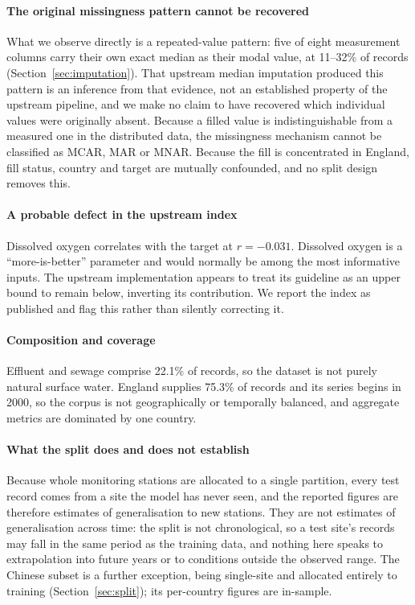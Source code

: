 \paragraph{The original missingness pattern cannot be recovered}
What we observe directly is a repeated-value pattern: five of eight measurement columns
carry their own exact median as their modal value, at 11--32\% of records
(Section~\ref{sec:imputation}). That upstream median imputation produced this pattern is
an inference from that evidence, not an established property of the upstream pipeline, and
we make no claim to have recovered which individual values were originally absent. Because
a filled value is indistinguishable from a measured one in the distributed data, the
missingness mechanism cannot be classified as MCAR, MAR or MNAR. Because the fill is concentrated in
England, fill status, country and target are mutually confounded, and no split design
removes this.

\paragraph{A probable defect in the upstream index}
Dissolved oxygen correlates with the target at $r = -0.031$. Dissolved oxygen is a
``more-is-better'' parameter and would normally be among the most informative inputs. The
upstream implementation appears to treat its guideline as an upper bound to remain below,
inverting its contribution. We report the index as published and flag this rather than
silently correcting it.

\paragraph{Composition and coverage}
Effluent and sewage comprise 22.1\% of records, so the dataset is not purely natural
surface water. England supplies 75.3\% of records and its series begins in 2000, so the
corpus is not geographically or temporally balanced, and aggregate metrics are dominated
by one country.

\paragraph{What the split does and does not establish}
Because whole monitoring stations are allocated to a single partition, every test record
comes from a site the model has never seen, and the reported figures are therefore
estimates of generalisation to new stations. They are not estimates of generalisation
across time: the split is not chronological, so a test site's records may fall in the
same period as the training data, and nothing here speaks to extrapolation into future
years or to conditions outside the observed range. The Chinese subset is a further
exception, being single-site and allocated entirely to training
(Section~\ref{sec:split}); its per-country figures are in-sample.

